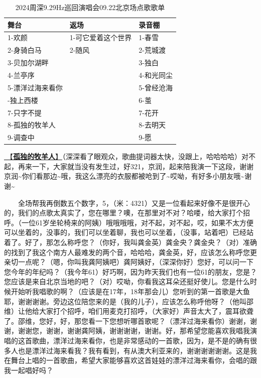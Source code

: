\documentclass[]{ctexbook}
\begin{document}
\begin{table}

\caption{\label{tab:unnamed-chunk-98}2024周深9.29Hz巡回演唱会09.22北京场点歌歌单}
\centering
\begin{tabular}[t]{lll}
\toprule
舞台 & 返场 & 录音棚\\
\midrule
1-欢颜 & 1-可它爱着这个世界 & 1-春雪\\
2-身骑白马 & 2-随风 & 2-荒城渡\\
3-贝加尔湖畔 &  & 3-独白\\
4-兰亭序 &  & 4-和光同尘\\
5-漂洋过海来看你 &  & 5-曾经沧海\\
\addlinespace
6-独上西楼 &  & 6-茧\\
7-只字不提 &  & 7-花开\\
8-孤独的牧羊人 &  & 8-去明天\\
9-调查中 &  & 9-愿\\
\bottomrule
\end{tabular}
\end{table}

\hyperref[lonely-shepherd]{🎵【\textbf{孤独的牧羊人}】}（深深看了眼观众，歌曲提词器太快，没跟上，哈哈哈哈）对不起，再来一下，大家就当没有发生过，好321，京润，起来陪我演一下这段，谢谢京润\textasciitilde 你们看那边\textasciitilde 哦，我这么漂亮的衣服都被呛到了\textasciitilde 哎呦，有好多小朋友哦\textasciitilde 谢谢\textasciitilde{}

  全场帮我再倒数五个数字，5，（米：4321）又是一位看起来好像不是很开心的，我们的点歌太真实了，您在哪里？噢，在那里对不对？哈喽，给大家打个招呼。（一位61岁坐轮椅来的阿姨）哦哦哦哦，对不起，对不起，哎，如果不太方便可以坐着的，没事的，我们可以坐着聊，我也可以坐着，（没事，站着吧）已经站着了。好了，那怎么称呼您？（你好，我叫龚金英）龚金央？龚金央？（对）准确的找到了我这个南方人最难发的两个音，哈哈哈，龚金英，好，应该怎么称呼您更亲切一点呢？（嗯，你叫我龚阿姨吧）龚阿姨好，（深深你好）您好，可以问一下您今年的年纪吗？（我今年61）好巧啊，因为昨天我们也有一位61的朋友，您是？您应该是来自北京当地的吧？（对）哎呦，你看我这耳朵还挺好使儿。您是什么时候开始听我唱歌的啊？（应该是在17年，18年那会儿）您听到的第一首歌是大鱼耶，谢谢谢谢。旁边这位陪您来的是（我的儿子），应该怎么称呼他呀？（他叫邵维）让他给大家打个招呼，咱们用麦克打招呼，（大家好）声音太大了，震耳欲聋了。邵维，您好，好，那您看一下您想听哪首歌呢？（漂洋过海来看你）谢谢，谢谢，谢谢您，谢谢，谢谢龚阿姨，谢谢谢谢，谢谢。好，那希望您能喜欢我唱我演唱的这首歌曲，漂洋过海来看你，也是非常感动的一首歌，因为，是不是的确有很多人也是漂洋过海来看我？我有看到，有从澳大利亚来的，谢谢谢谢谢谢。这是我在舞台上唱的一首歌曲，希望大家能够喜欢这首娃娃的漂洋过海来看你，会唱的跟我一起唱好吗？
\end{document}
